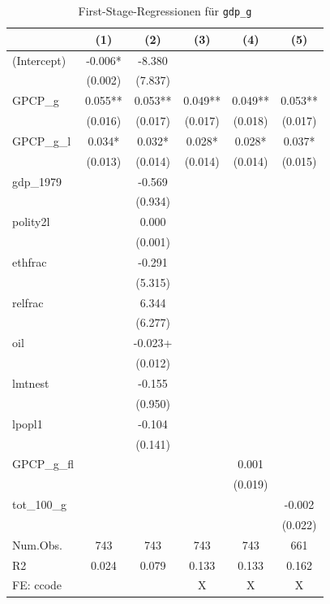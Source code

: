 \documentclass[
  a4paper,
  DIV=11,
  oneside]{scrreprt}
\begin{document}
\begingroup
\setlength{}
\setlength{}\fontsize{12.0pt}{14.4pt}\selectfont
\setlength{\LTpost}{0mm}

\begin{longtable}{@{\extracolsep{\fill}}lccccc}

\caption{\label{tbl-blablabla}First-Stage-Regressionen für
\texttt{gdp\_g}}

\tabularnewline

\toprule
  & (1) & (2) & (3) & (4) & (5) \\ 
\midrule\addlinespace[2.5pt]
(Intercept) & -0.006* & -8.380 &  &  &  \\ 
 & (0.002) & (7.837) &  &  &  \\ 
GPCP\_g & 0.055** & 0.053** & 0.049** & 0.049** & 0.053** \\ 
 & (0.016) & (0.017) & (0.017) & (0.018) & (0.017) \\ 
GPCP\_g\_l & 0.034* & 0.032* & 0.028* & 0.028* & 0.037* \\ 
 & (0.013) & (0.014) & (0.014) & (0.014) & (0.015) \\ 
gdp\_1979 &  & -0.569 &  &  &  \\ 
 &  & (0.934) &  &  &  \\ 
polity2l &  & 0.000 &  &  &  \\ 
 &  & (0.001) &  &  &  \\ 
ethfrac &  & -0.291 &  &  &  \\ 
 &  & (5.315) &  &  &  \\ 
relfrac &  & 6.344 &  &  &  \\ 
 &  & (6.277) &  &  &  \\ 
oil &  & -0.023+ &  &  &  \\ 
 &  & (0.012) &  &  &  \\ 
lmtnest &  & -0.155 &  &  &  \\ 
 &  & (0.950) &  &  &  \\ 
lpopl1 &  & -0.104 &  &  &  \\ 
 &  & (0.141) &  &  &  \\ 
GPCP\_g\_fl &  &  &  & 0.001 &  \\ 
 &  &  &  & (0.019) &  \\ 
tot\_100\_g &  &  &  &  & -0.002 \\ 
{} & {} & {} & {} & {} & {(0.022)} \\ 
Num.Obs. & 743 & 743 & 743 & 743 & 661 \\ 
R2 & 0.024 & 0.079 & 0.133 & 0.133 & 0.162 \\ 
FE: ccode &  &  & X & X & X \\ 
\bottomrule

\end{longtable}
\end{document}
